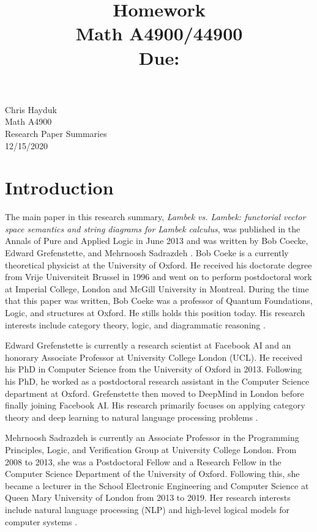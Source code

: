 \documentclass[11pt, reqno]{amsart}
\title[Homework \HW]{Homework \HW \\
Math A4900/44900\\
\small Due: \DUE}
\author{}
\theoremstyle{plain}
\theoremstyle{definition}
\theoremstyle{example}
\def\DUE{12/15/2020}
\begin{document}
\begin{flushright}
Chris Hayduk\\
Math A4900\\
Research Paper Summaries\\
\DUE
\end{flushright}

\section{Introduction}
\indent
The main paper in this research summary, \textit{Lambek vs. Lambek: functorial vector space semantics and string diagrams for Lambek calculus}, was published in the Annals of Pure and Applied Logic in June 2013 and was written by Bob Coecke, Edward Grefenstette, and Mehrnoosh Sadrazdeh \cite{lambekvlambek}. Bob Coeke is a currently theoretical physicist at the University of Oxford. He received his doctorate degree from Vrije Universiteit Brussel in 1996 and went on to perform postdoctoral work at Imperial College, London and McGill University in Montreal. During the time that this paper was written, Bob Coeke was a professor of Quantum Foundations, Logic, and structures at Oxford. He stills holds this position today. His research interests include category theory, logic, and diagrammatic reasoning \cite{coecke}.
\par
Edward Grefenstette is currently a research scientist at Facebook AI and an honorary Associate Professor at University College London (UCL). He received his PhD in Computer Science from the University of Oxford in 2013. Following his PhD, he worked as a postdoctoral research assistant in the Computer Science department at Oxford. Grefenstette then moved to DeepMind in London before finally joining Facebook AI. His research primarily focuses on applying category theory and deep learning to natural language processing problems \cite{grefenstette}.
\par
Mehrnoosh Sadrazdeh is currently an Associate Professor in the Programming Principles, Logic, and Verification Group at University College London. From 2008 to 2013, she was a Postdoctoral Fellow and a Research Fellow in the Computer Science Department of the University of Oxford. Following this, she became a lecturer in the School Electronic Engineering and Computer Science at Queen Mary University of London from 2013 to 2019. Her research interests include natural language processing (NLP) and high-level logical models for computer systems \cite{sadrzadeh}.
\end{document}
